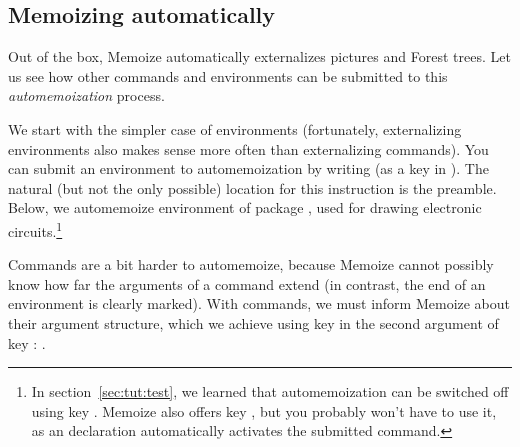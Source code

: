 \documentclass[a4paper,11pt]{article}
\begin{document}

\clearpage
\subsection{Memoizing automatically}
\label{sec:tut:automemoization}

Out of the box, Memoize automatically externalizes \TikZ pictures and Forest
trees.  Let us see how other commands and environments can be submitted to this
\emph{automemoization} process.

We start with the simpler case of environments (fortunately, externalizing
environments also makes sense more often than externalizing commands).  You can
submit an environment to automemoization by writing
 (as
a key in ).  The natural (but not the only possible) location
for this instruction is the preamble.  Below, we automemoize environment
 of package , used for drawing electronic
circuits.\footnote{In section~\ref{sec:tut:test}, we learned that
  automemoization can be switched off using key .  Memoize
  also offers key , but you probably won't have to use it, as
  an  declaration automatically activates the submitted command.}


Commands are a bit harder to automemoize, because Memoize cannot possibly know
how far the arguments of a command extend (in contrast, the end of an
environment is clearly marked).  With commands, we must inform Memoize about
their argument structure, which we achieve using key  in the
second argument of key :
.
\end{document}
